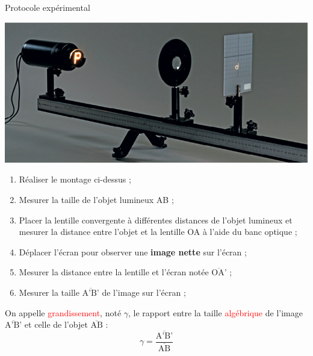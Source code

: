 \begin{doc}{Protocole expérimental}
\begin{center}
    \includegraphics[scale=0.8]{Images/TP/TP11/Protocole_lentille.PNG}
\end{center}
   \begin{enumerate}
       \item Réaliser le montage ci-dessus ;
       \item Mesurer la taille de l'objet lumineux AB ;
       \item Placer la lentille convergente à différentes distances de l'objet lumineux et mesurer la distance entre l'objet et la lentille OA à l'aide du banc optique ;
       \item Déplacer l’écran pour observer une \textbf{image nette} sur l’écran ;
       \item Mesurer la distance entre la lentille et l'écran notée $\overline{\text{OA'}}$ ;
       \item Mesurer la taille $\overline{\text{A'B'}}$ de l'image sur l'écran ;
   \end{enumerate}
\end{doc}

\begin{tcolorbox}[colback=green!5!white,colframe=green!75!black,title=\textbf{Définition du grandissement :}]  
    On appelle \textcolor{red}{grandissement}, noté $\gamma$, le rapport entre la taille \textcolor{red}{algébrique} de l'image $\overline{\text{A'B'}}$ et celle de l'objet $\overline{\text{AB}}$ :
    \begin{equation*}
        \gamma = \frac{\overline{\text{A'B'}}}{\overline{\text{AB}}}
    \end{equation*}
\end{tcolorbox}

